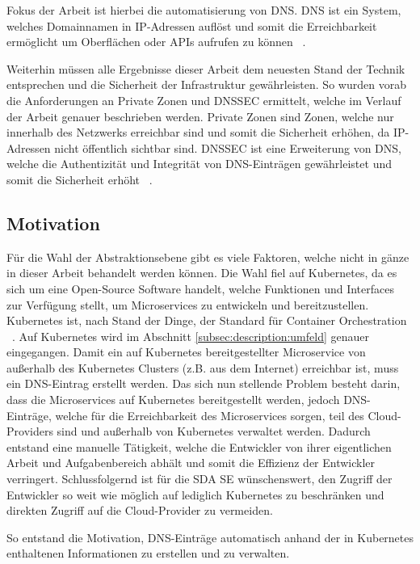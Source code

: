 Fokus der Arbeit ist hierbei die automatisierung von \ac{DNS}.
DNS ist ein System, welches Domainnamen in IP-Adressen auflöst und somit die Erreichbarkeit ermöglicht um Oberflächen oder APIs aufrufen zu können ~\cite{klensin2003role}.
\medskip

Weiterhin müssen alle Ergebnisse dieser Arbeit dem neuesten Stand der Technik entsprechen und die Sicherheit der Infrastruktur gewährleisten.
So wurden vorab die Anforderungen an Private Zonen und DNSSEC ermittelt, welche im Verlauf der Arbeit genauer beschrieben werden.
Private Zonen sind Zonen, welche nur innerhalb des Netzwerks erreichbar sind und somit die Sicherheit erhöhen, da IP-Adressen nicht öffentlich sichtbar sind.
DNSSEC ist eine Erweiterung von DNS, welche die Authentizität und Integrität von DNS-Einträgen gewährleistet und somit die Sicherheit erhöht ~\cite{arends2005rfc}.

\subsection{Motivation}
\label{subsec:description:motivation}
Für die Wahl der Abstraktionsebene gibt es viele Faktoren, welche nicht in gänze in dieser Arbeit behandelt werden können.
Die Wahl fiel auf Kubernetes, da es sich um eine Open-Source Software handelt, welche Funktionen und Interfaces zur Verfügung stellt, um Microservices zu entwickeln und bereitzustellen.
Kubernetes ist, nach Stand der Dinge, der Standard für Container Orchestration ~\cite[p.~2]{SpringerNature:2022}.
Auf Kubernetes wird im Abschnitt \ref{subsec:description:umfeld} genauer eingegangen.
\medskip
Damit ein auf Kubernetes bereitgestellter Microservice von außerhalb des Kubernetes Clusters (z.B. aus dem Internet) erreichbar ist, muss ein \ac{DNS}-Eintrag erstellt werden.
Das sich nun stellende Problem besteht darin, dass die Microservices auf Kubernetes bereitgestellt werden, jedoch DNS-Einträge, welche für die Erreichbarkeit des Microservices sorgen, teil des Cloud-Providers sind und außerhalb von Kubernetes verwaltet werden.
Dadurch entstand eine manuelle Tätigkeit, welche die Entwickler von ihrer eigentlichen Arbeit und Aufgabenbereich abhält und somit die Effizienz der Entwickler verringert.
Schlussfolgernd ist für die SDA SE wünschenswert, den Zugriff der Entwickler so weit wie möglich auf lediglich Kubernetes zu beschränken und direkten Zugriff auf die Cloud-Provider zu vermeiden.
\medskip

So entstand die Motivation, DNS-Einträge automatisch anhand der in Kubernetes enthaltenen Informationen zu erstellen und zu verwalten.

